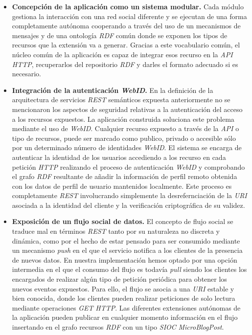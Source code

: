 \begin{itemize}
\item \textbf{Concepci\'on de la aplicaci\'on como un sistema modular.} Cada m\'odulo gestiona la interacci\'on con una red social diferente y se ejecutan de una forma completamente aut\'onoma cooperando a trav\'es del uso de un mecanismos de mensajes y de una ontolog\'ia \textit{RDF} com\'un donde se exponen los tipos de recursos que la extensi\'on va a generar. Gracias a este vocabulario com\'un, el n\'ucleo com\'un de la aplicaci\'on es capaz de integrar esos recurso en la \textit{API} \textit{HTTP}, recuperarlos del repositorio \textit{RDF} y darles el formato adecuado si es necesario.
\item \textbf{Integraci\'on de la autenticaci\'on \textit{WebID}.} En la definici\'on de la arquitectura de servicios \textit{REST} sem\'anticos expuesta anteriormente no se mencionaron los aspectos de seguridad relativas a la autenticaci\'on del acceso a los recursos expuestos. La aplicaci\'on construida soluciona este problema mediante el uso de \textit{WebID}. Cualquier recurso expuesto a trav\'es de la \textit{API} o tipo de recursos, puede ser marcado como publico, privado o accesible s\'olo por un determinado n\'umero de identidades \textit{WebID}. El sistema se encarga de autenticar la identidad de los usuarios accediendo a los recurso en cada petici\'on \textit{HTTP} realizando el proceso de autenticaci\'on \textit{WebID} y comprobando el grafo \textit{RDF} resultante de a\~nadir la informaci\'on de perfil remoto obtenida con los datos de perfil de usuario mantenidos localmente. Este proceso es completamente \textit{REST} involucrando simplemente la desrefernciaci\'on de la \textit{URI} asociada a la identidad del cliente y la verificaci\'on criptogr\'afica de su validez.
\item \textbf{Exposici\'on de un flujo social de datos.} El concepto de flujo social se traduce mal en t\'erminos \textit{REST} tanto por su naturaleza no discreta y din\'amica, como por el hecho de estar pensado para ser consumido mediante un mecanismo \textit{push} en el que el servicio notifica a los clientes de la presencia de nuevos datos. En nuestra implementaci\'on hemos optado por una opci\'on intermedia en el que el consumo del flujo es todav\'ia \textit{pull} siendo los clientes los encargados de realizar alg\'un tipo de petici\'on peri\'odica para obtener los nuevos eventos expuestos. Para ello, el flujo se asocia a una \textit{URI} estable y bien conocida, donde los clientes pueden realizar peticiones de solo lectura mediante operaciones \textit{GET} \textit{HTTP}. Las diferentes extensiones aut\'onomas de la aplicaci\'on pueden publicar en cualquier momento informaci\'on en el flujo insertando en el grafo recursos \textit{RDF} con un tipo \textit{SIOC} \textit{MicroBlogPost}.

\end{itemize}
